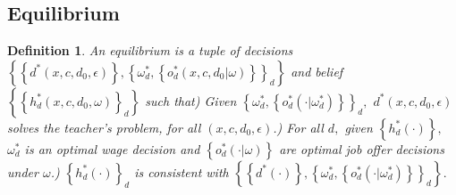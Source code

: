 \documentclass[notitlepage,12pt]{article}%
\newtheorem{definition}{Definition}
\begin{document}
\subsection{Equilibrium}

\begin{definition}
\label{def}An equilibrium is a tuple of decisions $\left\{  \left\{  d^{\ast
}\left(  x,c,d_{0},\epsilon\right)  \right\}  ,\left\{  \omega_{d}^{\ast
},\left\{  o_{d}^{\ast}\left(  x,c,d_{0}|\omega\right)  \right\}  \right\}
_{d}\right\}  $ and belief $\left\{  \left\{  h_{d}^{\ast}\left(
x,c,d_{0},\omega\right)  \right\}  _{d}\right\}  $ such that) Given
$\left\{  \omega_{d}^{\ast},\left\{  o_{d}^{\ast}\left(  \cdot|\omega
_{d}^{\ast}\right)  \right\}  \right\}  _{d},$ $d^{\ast}\left(  x,c,d_{0}%
,\epsilon\right)  $ solves the teacher's problem, for all $\left(
x,c,d_{0},\epsilon\right)  $.) For all $d,$ given $\left\{
h_{d}^{\ast}\left(  \cdot\right)  \right\}  ,$ $\omega_{d}^{\ast}$ is an
optimal wage decision and $\left\{  o_{d}^{\ast}\left(  \cdot|\omega\right)
\right\}  $ are optimal job offer decisions under $\omega$.)
$\left\{  h_{d}^{\ast}\left(  \cdot\right)  \right\}  _{d}$ is consistent with
$\left\{  \left\{  d^{\ast}\left(  \cdot\right)  \right\}  ,\left\{
\omega_{d}^{\ast},\left\{  o_{d}^{\ast}\left(  \cdot|\omega_{d}^{\ast}\right)
\right\}  \right\}  _{d}\right\}  .$
\end{definition}
\end{document}
